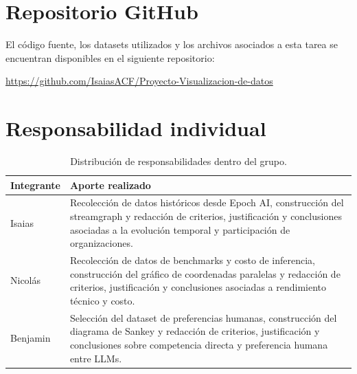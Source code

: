 \documentclass[12pt,a4paper]{article}
\begin{document}
\section{Repositorio GitHub}

El código fuente, los datasets utilizados y los archivos asociados a esta tarea se encuentran disponibles en el siguiente repositorio:

\begin{center}
\url{https://github.com/IsaiasACF/Proyecto-Visualizacion-de-datos}
\end{center}

\section{Responsabilidad individual}

\begin{table}[H]
\centering
\begin{tabular}{>{\raggedright\arraybackslash}p{3cm} >{\raggedright\arraybackslash}p{10cm}}
\toprule
\textbf{Integrante} & \textbf{Aporte realizado} \\
\midrule
Isaias & Recolección de datos históricos desde Epoch AI, construcción del streamgraph y redacción de criterios, justificación y conclusiones asociadas a la evolución temporal y participación de organizaciones. \\
\addlinespace
Nicolás & Recolección de datos de benchmarks y costo de inferencia, construcción del gráfico de coordenadas paralelas y redacción de criterios, justificación y conclusiones asociadas a rendimiento técnico y costo. \\
\addlinespace
Benjamin & Selección del dataset de preferencias humanas, construcción del diagrama de Sankey y redacción de criterios, justificación y conclusiones sobre competencia directa y preferencia humana entre LLMs. \\
\bottomrule
\end{tabular}
\caption{Distribución de responsabilidades dentro del grupo.}
\label{tab:responsabilidad}
\end{table}
\end{document}

